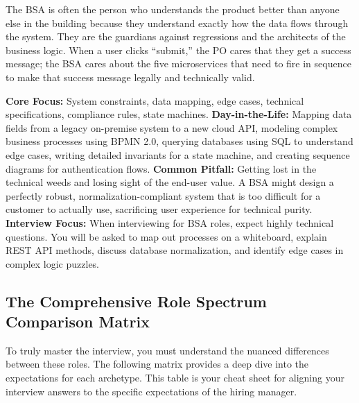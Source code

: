 \documentclass[
  11pt,
  openany,
  oneside]{book}
\begin{document}
The BSA is often the person who understands the product better than
anyone else in the building because they understand exactly how the data
flows through the system. They are the guardians against regressions and
the architects of the business logic. When a user clicks ``submit,'' the
PO cares that they get a success message; the BSA cares about the five
microservices that need to fire in sequence to make that success message
legally and technically valid.

\textbf{Core Focus:} System constraints, data mapping, edge cases,
technical specifications, compliance rules, state machines.
\textbf{Day-in-the-Life:} Mapping data fields from a legacy on-premise
system to a new cloud API, modeling complex business processes using
BPMN 2.0, querying databases using SQL to understand edge cases, writing
detailed invariants for a state machine, and creating sequence diagrams
for authentication flows. \textbf{Common Pitfall:} Getting lost in the
technical weeds and losing sight of the end-user value. A BSA might
design a perfectly robust, normalization-compliant system that is too
difficult for a customer to actually use, sacrificing user experience
for technical purity. \textbf{Interview Focus:} When interviewing for
BSA roles, expect highly technical questions. You will be asked to map
out processes on a whiteboard, explain REST API methods, discuss
database normalization, and identify edge cases in complex logic
puzzles.

\subsection{The Comprehensive Role Spectrum Comparison
Matrix}\label{the-comprehensive-role-spectrum-comparison-matrix}

To truly master the interview, you must understand the nuanced
differences between these roles. The following matrix provides a deep
dive into the expectations for each archetype. This table is your cheat
sheet for aligning your interview answers to the specific expectations
of the hiring manager.
\end{document}
